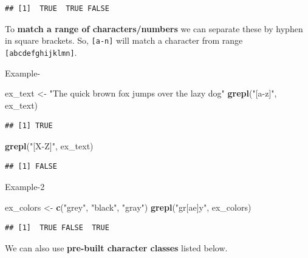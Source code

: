 \documentclass[
]{book}
\newenvironment{Shaded}{\begin{snugshade}}{\end{snugshade}}
\newcommand{\FunctionTok}[1]{\textcolor[rgb]{0.13,0.29,0.53}{\textbf{#1}}}
\newcommand{\NormalTok}[1]{#1}
\newcommand{\OtherTok}[1]{\textcolor[rgb]{0.56,0.35,0.01}{#1}}
\newcommand{\StringTok}[1]{\textcolor[rgb]{0.31,0.60,0.02}{#1}}
\begin{document}
\begin{verbatim}
## [1]  TRUE  TRUE FALSE
\end{verbatim}

To \textbf{match a range of characters/numbers} we can separate these by hyphen in square brackets. So, \texttt{{[}a-n{]}} will match a character from range \texttt{{[}abcdefghijklmn{]}}.

Example-

\begin{Shaded}
\begin{Highlighting}[]
\NormalTok{ex\_text }\OtherTok{\textless{}{-}} \StringTok{"The quick brown fox jumps over the lazy dog"}
\FunctionTok{grepl}\NormalTok{(}\StringTok{"[a{-}z]"}\NormalTok{, ex\_text)}
\end{Highlighting}
\end{Shaded}

\begin{verbatim}
## [1] TRUE
\end{verbatim}

\begin{Shaded}
\begin{Highlighting}[]
\FunctionTok{grepl}\NormalTok{(}\StringTok{"[X{-}Z]"}\NormalTok{, ex\_text)}
\end{Highlighting}
\end{Shaded}

\begin{verbatim}
## [1] FALSE
\end{verbatim}

Example-2

\begin{Shaded}
\begin{Highlighting}[]
\NormalTok{ex\_colors }\OtherTok{\textless{}{-}} \FunctionTok{c}\NormalTok{(}\StringTok{"grey"}\NormalTok{, }\StringTok{"black"}\NormalTok{, }\StringTok{"gray"}\NormalTok{)}
\FunctionTok{grepl}\NormalTok{(}\StringTok{"gr[ae]y"}\NormalTok{, ex\_colors)}
\end{Highlighting}
\end{Shaded}

\begin{verbatim}
## [1]  TRUE FALSE  TRUE
\end{verbatim}

We can also use \textbf{pre-built character classes} listed below.
\end{document}
